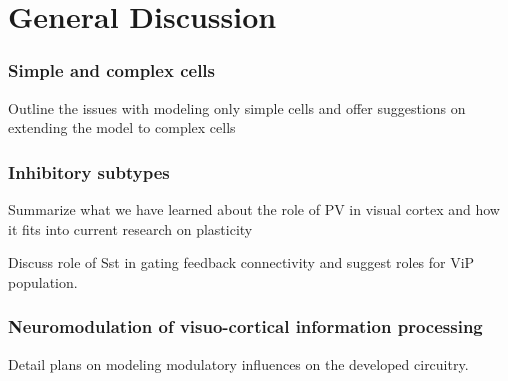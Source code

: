 \chapter{General Discussion}

\subsection{Simple and complex cells}

Outline the issues with modeling only simple cells and offer
suggestions on extending the model to complex cells

\subsection{Inhibitory subtypes}

Summarize what we have learned about the role of PV in visual cortex
and how it fits into current research on plasticity

Discuss role of Sst in gating feedback connectivity and suggest
roles for ViP population.

\subsection{Neuromodulation of visuo-cortical information processing}

Detail plans on modeling modulatory influences on the developed
circuitry.
